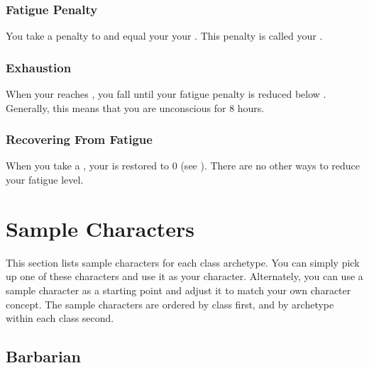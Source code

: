             \subsubsection{Fatigue Penalty}\label{Fatigue Penalty}
                You take a penalty to  and  equal your  \sub your .
                This penalty is called your .

        \subsubsection{Exhaustion}\label{Exhaustion}
            When your  reaches , you fall \unconscious until your fatigue penalty is reduced below .
            Generally, this means that you are unconscious for 8 hours.

        \subsubsection{Recovering From Fatigue}
            When you take a , your  is restored to 0 (see ).
            There are no other ways to reduce your fatigue level.

\section{Sample Characters}

    This section lists sample characters for each class archetype.
    You can simply pick up one of these characters and use it as your character.
    Alternately, you can use a sample character as a starting point and adjust it to match your own character concept.
    The sample characters are ordered by class first, and by archetype within each class second.

    \subsection{Barbarian}

